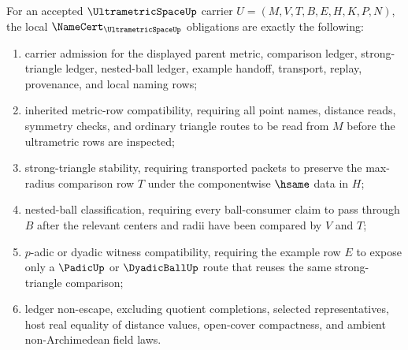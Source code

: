 \begin{theorem}
\label{thm:ultrametric-space-namecert-obligations}
For an accepted $\UltrametricSpaceUp$ carrier $U=(M,V,T,B,E,H,K,P,N)$, the local $\NameCert_{\UltrametricSpaceUp}$ obligations are exactly the following:
\begin{enumerate}
\item carrier admission for the displayed parent metric, comparison ledger, strong-triangle ledger, nested-ball ledger, example handoff, transport, replay, provenance, and local naming rows;
\item inherited metric-row compatibility, requiring all point names, distance reads, symmetry checks, and ordinary triangle routes to be read from $M$ before the ultrametric rows are inspected;
\item strong-triangle stability, requiring transported packets to preserve the max-radius comparison row $T$ under the componentwise $\hsame$ data in $H$;
\item nested-ball classification, requiring every ball-consumer claim to pass through $B$ after the relevant centers and radii have been compared by $V$ and $T$;
\item $p$-adic or dyadic witness compatibility, requiring the example row $E$ to expose only a $\PadicUp$ or $\DyadicBallUp$ route that reuses the same strong-triangle comparison;
\item ledger non-escape, excluding quotient completions, selected representatives, host real equality of distance values, open-cover compactness, and ambient non-Archimedean field laws.
\end{enumerate}
\end{theorem}

